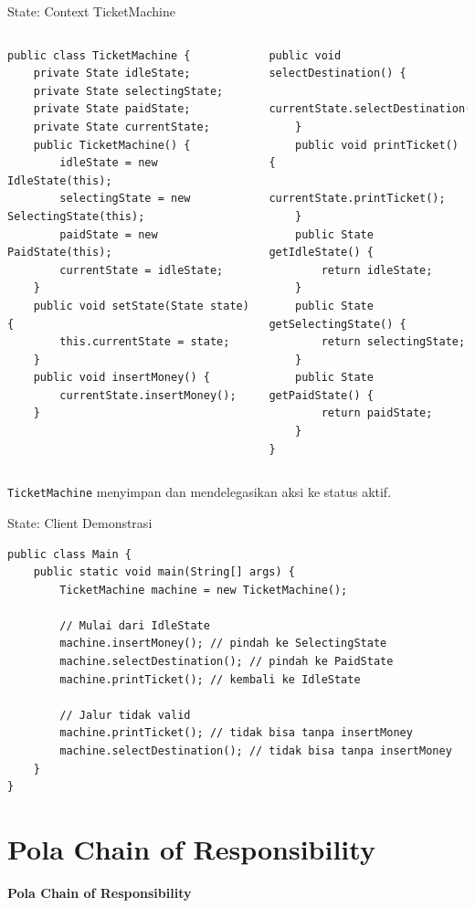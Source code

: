\documentclass[aspectratio=169, table]{beamer}
\begin{document}
\begin{frame}[fragile]{State: Context TicketMachine}
	\vspace{10pt}
\begin{columns}[T]
\begin{lstlisting}[style=JavaStyle]
public class TicketMachine {
	private State idleState;
	private State selectingState;
	private State paidState;
	private State currentState;
	public TicketMachine() {
		idleState = new IdleState(this);
		selectingState = new SelectingState(this);
		paidState = new PaidState(this);
		currentState = idleState;
	}
	public void setState(State state) {
		this.currentState = state;
	}
	public void insertMoney() {
		currentState.insertMoney();
	}
\end{lstlisting}

\begin{lstlisting}[style=JavaStyle]
	public void selectDestination() {
		currentState.selectDestination();
	}
	public void printTicket() {
		currentState.printTicket();
	}
	public State getIdleState() {
		return idleState;
	}
	public State getSelectingState() {
		return selectingState;
	}
	public State getPaidState() {
		return paidState;
	}
}
\end{lstlisting}
\end{columns}
\small \texttt{TicketMachine} menyimpan dan mendelegasikan aksi ke status aktif.
\end{frame}

\begin{frame}[fragile]{State: Client Demonstrasi}
\begin{lstlisting}[style=JavaStyle]
public class Main {
	public static void main(String[] args) {
		TicketMachine machine = new TicketMachine();
		
		// Mulai dari IdleState
		machine.insertMoney(); // pindah ke SelectingState
		machine.selectDestination(); // pindah ke PaidState
		machine.printTicket(); // kembali ke IdleState
		
		// Jalur tidak valid
		machine.printTicket(); // tidak bisa tanpa insertMoney
		machine.selectDestination(); // tidak bisa tanpa insertMoney
	}
}
\end{lstlisting}
\end{frame}


\section{Pola Chain of Responsibility}
\begin{frame}{\hfill}
\centering
\textbf{\Huge{Pola Chain of Responsibility}}
\end{frame}
\end{document}
